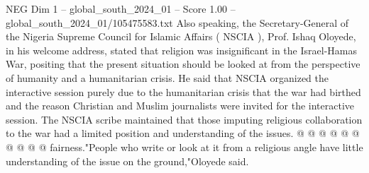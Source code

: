 \begin{textsample}{NEG Dim 1 – global\_south\_2024\_01 – Score 1.00 – global\_south\_2024\_01/105475583.txt}
Also speaking, the Secretary-General of the Nigeria Supreme Council for Islamic Affairs ( NSCIA ), Prof.
Ishaq Oloyede, in his welcome address, stated that religion was insignificant in the Israel-Hamas War, positing that the present situation should be looked at from the perspective of humanity and a humanitarian crisis.
He said that NSCIA organized the interactive session purely due to the humanitarian crisis that the war had birthed and the reason Christian and Muslim journalists were invited for the interactive session.
The NSCIA scribe maintained that those imputing religious collaboration to the war had a limited position and understanding of the issues. @ @ @ @ @ @ @ @ @ @ fairness."People who write or look at it from a religious angle have little understanding of the issue on the ground,"Oloyede said.

\end{textsample}
